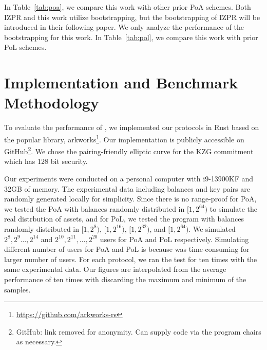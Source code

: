

In Table~\ref{tab:poa}, we compare this work with other prior PoA schemes. Both IZPR and this work utilize bootstrapping, but the bootstrapping of IZPR will be introduced in their following paper. We only analyze the performance of the bootstrapping for this work. In Table~\ref{tab:pol}, we compare this work with prior PoL schemes.

\section{Implementation and Benchmark Methodology}





To evaluate the performance of \Sys, we implemented our protocols in Rust based on the popular library, arkworks\footnote{\url{https://github.com/arkworks-rs}}. Our implementation is publicly accessible on GitHub\footnote{GitHub: link removed for anonymity. Can supply code via the program chairs as necessary.}. We chose the pairing-friendly elliptic curve \bls for the KZG commitment which has 128 bit security.

Our experiments were conducted on a personal computer with i9-13900KF and 32GB of memory. The experimental data including balances and \secp key pairs are randomly generated locally for simplicity. Since there is no range-proof for PoA, we tested the PoA with balances randomly distributed in $[1,2^{64})$ to simulate the real distrbution of assets, and for PoL, we tested the program with balances randomly distributed in $[1,2^8)$, $[1,2^{16})$, $[1,2^{32})$, and $[1,2^{64})$. We simulated $2^8,2^9\dots,2^{14}$ and $2^{10},2^{11},\dots,2^{20}$ users for PoA and PoL respectively. Simulating different number of users for PoA and PoL is because \bootstrap was time-consuming for larger number of users. For each protocol, we ran the test for ten times with the same experimental data. Our figures are interpolated from the average performance of ten times with discarding the maximum and minimum of the samples.

